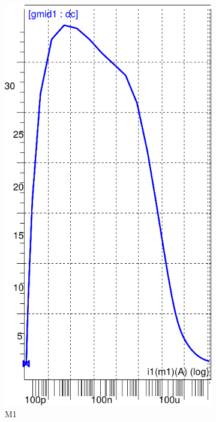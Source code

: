 \begin{figure}[!tbp]
   \begin{subfigure}[b]{0.25\textwidth}
       \includegraphics[width=\textwidth]{images/gmid_log10id_m1}
   \caption{M1}
   \label{fig:f1}
   \end{subfigure}
   \begin{subfigure}[b]{0.35\textwidth}

\end{subfigure}
\end{figure}
